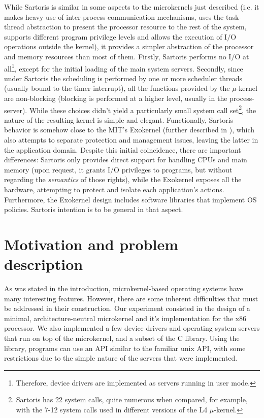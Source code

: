 \documentclass[12pt, letterpaper, oneside, english]{article}
\begin{document}
While Sartoris is similar in some aspects to the microkernels just described (i.e. it makes heavy use of inter-process communication mechanisms, uses the task-thread abstraction to present the processor resource to the rest of the system, supports different program privilege levels and allows the execution of I$/$O operations outside the kernel), it provides a simpler abstraction of the processor and memory resources than most of them. Firstly, Sartoris performs no I$/$O at all\footnote{Therefore, device drivers are implemented as servers running in user mode.}, except for the initial loading of the main system servers. Secondly, since under Sartoris the scheduling is performed by one or more scheduler threads (usually bound to the timer interrupt), all the functions provided by the $\mu$-kernel are non-blocking (blocking is performed at a higher level, usually in the process-server). While these choices didn't yield a particularly small system call set\footnote{Sartoris has 22 system calls, quite numerous when compared, for example, with the 7-12 system calls used in different versions of the L4 $\mu$-kernel.}, the nature of the resulting kernel is simple and elegant. Functionally, Sartoris behavior is somehow close to the MIT's Exokernel (further described in \cite{Exo}), which also attempts to separate protection and management issues, leaving the latter in the application domain. Despite this initial coincidence, there are important differences: Sartoris only provides direct support for handling CPUs and main memory (upon request, it grants I$/$O privileges to programs, but without regarding the \textit{semantics} of those rights), while the Exokernel exposes all the hardware, attempting to protect and isolate each application's actions. Furthermore, the Exokernel design includes software libraries that implement OS policies. Sartoris intention is to be general in that aspect.

\section{Motivation and problem description}

As was stated in the introduction, microkernel-based operating systems have many interesting features. However, there are some inherent difficulties that must be addressed in their construction. Our experiment consisted in the design of a minimal, architecture-neutral microkernel and it's implementation for the x86 processor. We also implemented a few device drivers and operating system servers that run on top of the microkernel, and a subset of the C library. Using the library, programs can use an API similar to the familiar unix API, with some restrictions due to the simple nature of the servers that were implemented.
\end{document}
